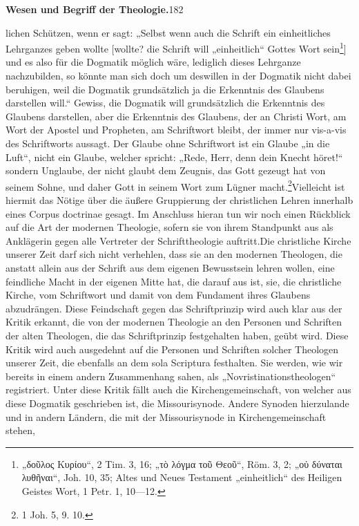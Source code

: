 \begin{flushleft}\textbf{Wesen und Begriff der Theologie.}\hfill 182\end{flushleft}lichen Schützen, wenn er sagt: „Selbst wenn auch die Schrift ein einheitliches Lehrganzes geben wollte [wollte? die Schrift will „einheitlich“ Gottes Wort sein\footnote{„δοῦλος Κυρίου“, 2 Tim. 3, 16; „τὸ λόγμα τοῦ Θεοῦ“, Röm. 3, 2; „οὐ δύναται λυθῆναι“, Joh. 10, 35; Altes und Neues Testament „einheitlich“ des Heiligen Geistes Wort, 1 Petr. 1, 10—12.}] und es also für die Dogmatik möglich wäre, lediglich dieses Lehrganze nachzubilden, so könnte man sich doch um deswillen in der Dogmatik nicht dabei beruhigen, weil die Dogmatik grundsätzlich ja die Erkenntnis des Glaubens darstellen will.“ Gewiss, die Dogmatik will grundsätzlich die Erkenntnis des Glaubens darstellen, aber die Erkenntnis des Glaubens, der an Christi Wort, am Wort der Apostel und Propheten, am Schriftwort bleibt, der immer nur vis-a-vis des Schriftworts aussagt. Der Glaube ohne Schriftwort ist ein Glaube „in die Luft“, nicht ein Glaube, welcher spricht: „Rede, Herr, denn dein Knecht höret!“ sondern Unglaube, der nicht glaubt dem Zeugnis, das Gott gezeugt hat von seinem Sohne, und daher Gott in seinem Wort zum Lügner macht.\footnote{1 Joh. 5, 9. 10.}Vielleicht ist hiermit das Nötige über die äußere Gruppierung der christlichen Lehren innerhalb eines Corpus doctrinae gesagt. Im Anschluss hieran tun wir noch einen Rückblick auf die Art der modernen Theologie, sofern sie von ihrem Standpunkt aus als Anklägerin gegen alle Vertreter der Schrifttheologie auftritt.Die christliche Kirche unserer Zeit darf sich nicht verhehlen, dass sie an den modernen Theologen, die anstatt allein aus der Schrift aus dem eigenen Bewusstsein lehren wollen, eine feindliche Macht in der eigenen Mitte hat, die darauf aus ist, sie, die christliche Kirche, vom Schriftwort und damit von dem Fundament ihres Glaubens abzudrängen. Diese Feindschaft gegen das Schriftprinzip wird auch klar aus der Kritik erkannt, die von der modernen Theologie an den Personen und Schriften der alten Theologen, die das Schriftprinzip festgehalten haben, geübt wird. Diese Kritik wird auch ausgedehnt auf die Personen und Schriften solcher Theologen unserer Zeit, die ebenfalls an dem sola Scriptura festhalten. Sie werden, wie wir bereits in einem andern Zusammenhang sahen, als „Novristinationstheologen“ registriert. Unter diese Kritik fällt auch die Kirchengemeinschaft, von welcher aus diese Dogmatik geschrieben ist, die Missourisynode. Andere Synoden hierzulande und in andern Ländern, die mit der Missourisynode in Kirchengemeinschaft stehen,